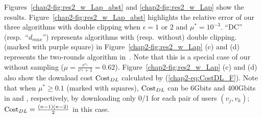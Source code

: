
Figures~\ref{chap2-fig:res2_w_Lap_abst} and \ref{chap2-fig:res2_w_Lap} show the results. 
Figure~\ref{chap2-fig:res2_w_Lap_abst} highlights the relative error of our three algorithms with double clipping when $\epsilon=1$ or $2$ and $\mu^*=10^{-3}$. 
``DC'' (resp.~``$d_{max}$'') represents algorithms with (resp.~without) double clipping. 
\AlgSec{} (marked with purple square) in Figure~\ref{chap2-fig:res2_w_Lap} (c) and (d) represents the two-rounds algorithm in~\cite{Imola_USENIX21}. 
Note that this is a special case of our \AlgOne{} without sampling ($\mu =\frac{e^{\epsilon_1}}{e^{\epsilon_1}+1} = 0.62$). 
Figure~\ref{chap2-fig:res2_w_Lap} (c) and (d) also show the download cost $\mathrm{Cost}_{DL}$ calculated by 
(\ref{chap2-eq:CostDL_F}). 
Note that 
when $\mu^* \geq 0.1$ (marked with squares), 
$\mathrm{Cost}_{DL}$ can be $6$Gbits and $400$Gbits in \GPlus{} and \IMDB{}, respectively, by downloading only 0/1 for each pair of users $(v_j,v_k)$; $\mathrm{Cost}_{DL} = \frac{(n-1)(n-2)}{2}$ in this case. 

